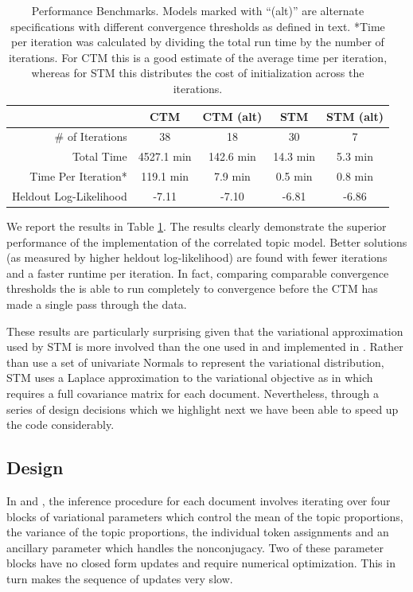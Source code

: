 \documentclass[article,shortnames]{jss}
\begin{document}
\begin{table}[]
\centering
\begin{tabular}{r|cccc}
                       & CTM & CTM (alt) & STM & STM (alt) \\
                       \hline
\# of Iterations       & 38 & 18   & 30  & 7  \\
Total Time             & 4527.1 min  & 142.6 min  & 14.3 min & 5.3 min  \\
Time Per Iteration*     & 119.1 min  & 7.9 min  & 0.5 min & 0.8 min\\
Heldout Log-Likelihood & -7.11 & -7.10 & -6.81  & -6.86
\end{tabular}
\caption{Performance Benchmarks.  Models marked with ``(alt)'' are alternate specifications with different convergence thresholds as defined in text. *Time per iteration was calculated by dividing the total run time by the number of iterations.  For CTM this is a good estimate of the average time per iteration, whereas for STM this distributes the cost of initialization across the iterations.}
\label{tab:perform}
\end{table}
We report the results in Table \ref{tab:perform}.  The results clearly demonstrate the superior performance of the  implementation of the correlated topic model.  Better solutions (as measured by higher heldout log-likelihood) are found with fewer iterations and a faster runtime per iteration.  In fact, comparing comparable convergence thresholds the  is able to run completely to convergence before the CTM has made a single pass through the data.

These results are particularly surprising given that the variational approximation used by STM is more involved than the one used in \cite{blei2007correlated} and implemented in .  Rather than use a set of univariate Normals to represent the variational distribution, STM uses a Laplace approximation to the variational objective as in \cite{wang2013variational} which requires a full covariance matrix for each document.  Nevertheless, through a series of design decisions which we highlight next we have been able to speed up the code considerably.

\subsection{Design}
In \cite{blei2007correlated} and , the inference procedure for each document involves iterating over four blocks of variational parameters which control the mean of the topic proportions, the variance of the topic proportions, the individual token assignments and an ancillary parameter which handles the nonconjugacy.  Two of these parameter blocks have no closed form updates and require numerical optimization.  This in turn makes the sequence of updates very slow.
\end{document}
